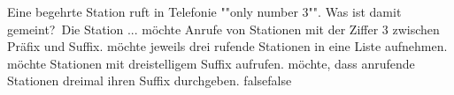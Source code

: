     {Eine begehrte Station ruft in Telefonie ""only number 3"". Was ist damit gemeint? Die Station ...}
    {möchte Anrufe von Stationen mit der Ziffer 3 zwischen Präfix und Suffix.}
    {möchte jeweils drei rufende Stationen in eine Liste aufnehmen.}
    {möchte Stationen mit dreistelligem Suffix aufrufen.}
    {möchte, dass anrufende Stationen dreimal ihren Suffix durchgeben.}
    {false}{false}